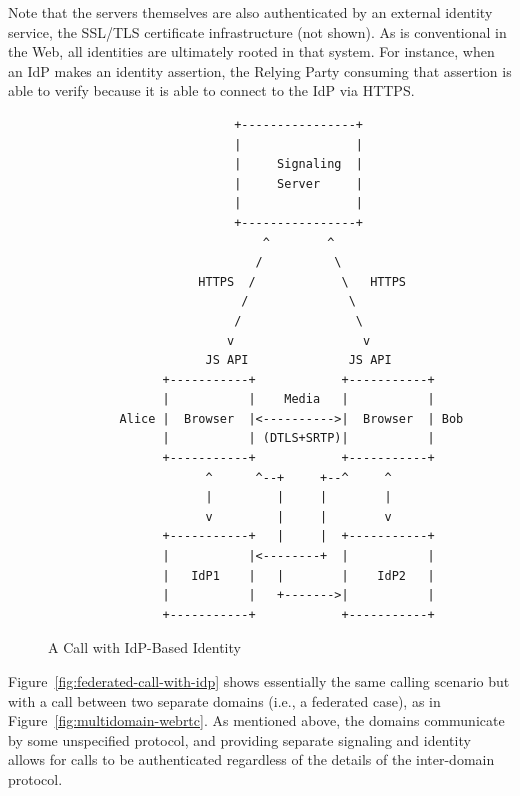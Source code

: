 \documentclass{article}
\begin{document}
Note that the servers themselves are also authenticated by an
external identity service, the SSL/TLS certificate infrastructure
(not shown).  As is conventional in the Web, all identities are
ultimately rooted in that system.  For instance, when an IdP makes an
identity assertion, the Relying Party consuming that assertion is
able to verify because it is able to connect to the IdP via HTTPS.

\begin{figure}[ht]
\begin{verbatim}
                          +----------------+
                          |                |
                          |     Signaling  |
                          |     Server     |
                          |                |
                          +----------------+
                              ^        ^
                             /          \
                     HTTPS  /            \   HTTPS
                           /              \
                          /                \
                         v                  v
                      JS API              JS API
                +-----------+            +-----------+
                |           |    Media   |           |
          Alice |  Browser  |<---------->|  Browser  | Bob
                |           | (DTLS+SRTP)|           |
                +-----------+            +-----------+
                      ^      ^--+     +--^     ^
                      |         |     |        |
                      v         |     |        v
                +-----------+   |     |  +-----------+
                |           |<--------+  |           |
                |   IdP1    |   |        |    IdP2   |
                |           |   +------->|           |
                +-----------+            +-----------+
\end{verbatim}
\caption{A Call with IdP-Based Identity}
\label{fig:call-with-idp}
\end{figure}

Figure~\ref{fig:federated-call-with-idp} shows essentially the same calling scenario but with a call
between two separate domains (i.e., a federated case), as in
Figure~\ref{fig:multidomain-webrtc}.  As mentioned above, the domains communicate by some
unspecified protocol, and providing separate signaling and identity
allows for calls to be authenticated regardless of the details of the
inter-domain protocol.
\end{document}
